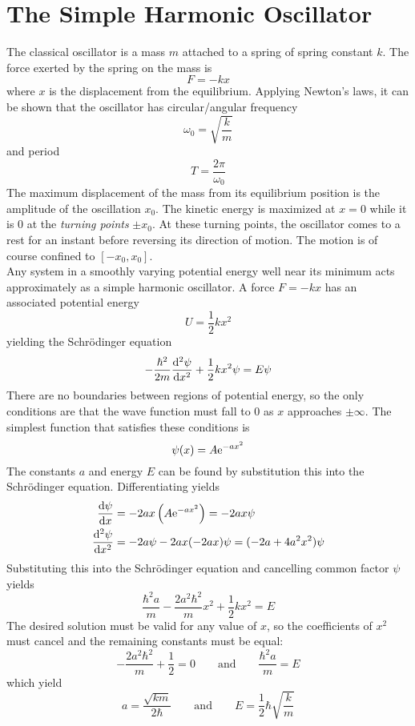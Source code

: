 \documentclass{subfiles}
\begin{document}
	\section{The Simple Harmonic Oscillator}
		The classical oscillator is a mass \(m\) attached to a spring of spring constant \(k\). The force exerted by the spring on the mass is
			\[F = -kx \tag{spring force}\] 
			where \(x\) is the displacement from the equilibrium. Applying Newton's laws, it can be shown that the oscillator has circular/angular frequency
			\[\omega_0 = \sqrt{\frac{k}{m}} \tag{angular frequency}\]
			and period
			\[T = \frac{2\pi}{\omega_0} \tag{period}\]
			The maximum displacement of the mass from its equilibrium position is the amplitude of the oscillation \(x_0\). The kinetic energy is maximized at \(x = 0\) while it is 0 at the \textit{turning points} \(\pm x_0\). At these turning points, the oscillator comes to a rest for an instant before reversing its direction of motion. The motion is of course confined to \([-x_0, x_0]\). \\
		Any system in a smoothly varying potential energy well near its minimum acts approximately as a simple harmonic oscillator. A force \(F = -kx\) has an associated potential energy
			\[U = \frac{1}{2}kx^2\]
			yielding the Schr\"odinger equation
			\[-\frac{\hbar^2}{2m}\dv[2]{\psi}{x} + \frac{1}{2}kx^2\psi = E\psi\]
			There are no boundaries between regions of potential energy, so the only conditions are that the wave function must fall to 0 as \(x\) approaches \(\pm\infty\). The simplest function that satisfies these conditions is
			\[\psi(x) = A\text{e}^{-ax^2}\]
			The constants \(a\) and energy \(E\) can be found by substitution this into the Schr\"odinger equation. Differentiating yields
			\begin{align*}
				\dv{\psi}{x} &= -2ax\left(A\text{e}^{-ax^2}\right) = -2ax\psi \\
				\dv[2]{\psi}{x} &= -2a\psi - 2ax(-2ax)\psi = (-2a + 4a^2x^2)\psi
			\end{align*}
			Substituting this into the Schr\"odinger equation and cancelling common factor \(\psi\) yields
			\[\frac{\hbar^2a}{m} - \frac{2a^2\hbar^2}{m}x^2 + \frac{1}{2}kx^2 = E\]
			The desired solution must be valid for any value of \(x\), so the coefficients of \(x^2\) must cancel and the remaining constants must be equal:
			\[
				-\frac{2a^2\hbar^2}{m} + \frac{1}{2} = 0 \qquad \text{and} \qquad
					\frac{\hbar^2a}{m} = E
			\]
			which yield
			\[
				a = \frac{\sqrt{km}}{2\hbar} \qquad \text{and} \qquad
					E = \frac{1}{2}\hbar\sqrt{\frac{k}{m}}
			\]
\end{document}
